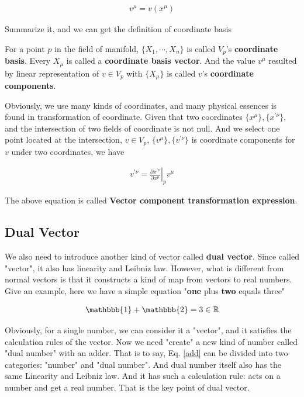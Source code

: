 \begin{align}
    v^{\mu}=v(x^{\mu})
\end{align}

Summarize it, and we can get the definition of coordinate basis 

\begin{tcolorbox}[title=\textbf{Coordinate},colback=SeaGreen!10!CornflowerBlue!10,colframe=RoyalPurple!55!Aquamarine!100!]
    For a point $p$ in the field of manifold, $\{X_{1},\cdots,X_{n}\}$ is called $V_{p}$'s \textbf{coordinate basis}. 
    Every $X_{\mu}$ is called a \textbf{coordinate basis vector}. And the value $v^{\mu}$ resulted by linear representation of $v\in V_{p}$ with $\{X_{\mu}\}$ is called $v$'s \textbf{coordinate components}.
\end{tcolorbox}

Obviously, we use many kinds of coordinates, and many physical essences is found in transformation of coordinate. Given that two coordinates $\{x^{\mu}\}, \{x^{\prime\nu}\}$, and the intersection of two fields of coordinate is not null. And we select one point located at the intersection, $v\in V_{p}$, $\{v^{\mu}\},\{v^{\prime \nu}\}$ is coordinate components for $v$ under two coordinates, we have


\begin{align}
    v^{\prime \nu}=\left.\frac{\partial x^{\prime \nu}}{\partial x^{\mu}}\right|_{p}v^{\mu}
\end{align}

The above equation is called \textbf{Vector component transformation expression}.

\subsection{Dual Vector}


We also need to introduce another kind of vector called \textbf{dual vector}. Since called "vector", it also has linearity and Leibniz law. However, what is different from normal vectors is that it constructs a kind of map from vectors to real numbers. Give an example, here we have a simple equation "\textbf{one} plus \textbf{two} equals three"

\begin{align}
    \mathbbb{1}+\mathbbb{2}=3\in \mathbb{R}\label{add}
\end{align}

Obviously, for a single number, we can consider it a "vector", and it satisfies the calculation rules of the vector. Now we need "create" a new kind of number called "dual number" with an adder. That is to say, Eq. \ref{add} can be divided into two categories: "number" and "dual number". And dual number itself also has the same Linearity and Leibniz law. And it has such a calculation rule: acts on a number and get a real number. That is the key point of dual vector.

